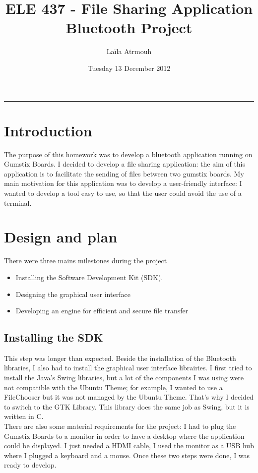 \documentclass[a4paper, 12pt, final]{article}
\title{ ELE 437 - File Sharing Application \\ Bluetooth Project }
\author{ Laïla Atrmouh }
\date{Tuesday 13 December 2012}
\begin{document}
\maketitle  
   
\rule[0.5ex]{\textwidth}{0.1mm}

\section{Introduction} 
The purpose of this homework was to develop a bluetooth application running on Gumstix Boards. I decided to develop a file sharing application: the aim of this application is to facilitate the sending of files between two gumstix boards. My main motivation for this application was to develop a user-friendly interface: I wanted to develop a tool easy to use, so that the user could avoid the use of a terminal. 

 
\section{Design and plan} 
There were three mains milestones during the project
\begin{itemize}
\item Installing the Software Development Kit (SDK).
\item Designing the graphical user interface
\item Developing an engine for efficient and secure file transfer
\end{itemize}


\subsection{Installing the SDK}
This step was longer than expected. Beside the installation of the Bluetooth libraries, I also had to install the graphical user interface librairies. I first tried to install the Java's Swing libraries, but a lot of the components I was using were not compatible with the Ubuntu Theme; for example, I wanted to use a FileChooser but it was not managed by the Ubuntu Theme. That's why I decided to switch to the GTK Library. This library does the same job as Swing, but it is written in C. \\
There are also some material requirements for the project: I had to plug the Gumstix Boards to a monitor in order to have a desktop where the application could be displayed. I just needed a HDMI cable, I used the monitor as a USB hub where I plugged a keyboard and a mouse. Once these two steps were done, I was ready to develop.
\end{document}
